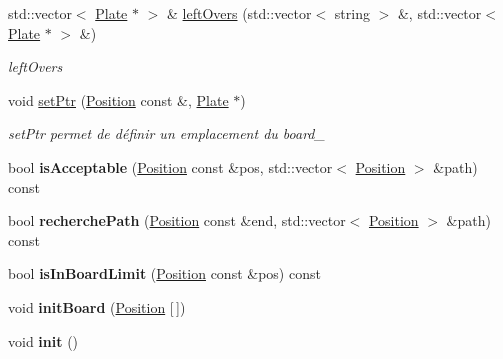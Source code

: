 \begin{DoxyCompactItemize}
\item 
std\+::vector$<$ \mbox{\hyperlink{class_plate}{Plate}} $\ast$ $>$ \& \mbox{\hyperlink{class_board_a3164f6e33a9c5a7a02d899407ef8a3d1}{left\+Overs}} (std\+::vector$<$ string $>$ \&, std\+::vector$<$ \mbox{\hyperlink{class_plate}{Plate}} $\ast$ $>$ \&)
\begin{DoxyCompactList}\small\item\em left\+Overs \end{DoxyCompactList}\item 
\mbox{\label{class_board_a7fb0f1c798ff6cb63c3105baa0725ac9}} 
void \mbox{\hyperlink{class_board_a7fb0f1c798ff6cb63c3105baa0725ac9}{set\+Ptr}} (\mbox{\hyperlink{class_position}{Position}} const \&, \mbox{\hyperlink{class_plate}{Plate}} $\ast$)
\begin{DoxyCompactList}\small\item\em set\+Ptr permet de définir un emplacement du board\+\_\+ \end{DoxyCompactList}\item 
\mbox{\label{class_board_a1217bc275b0adb87cb9c4be7bd7887cb}} 
bool {\bfseries is\+Acceptable} (\mbox{\hyperlink{class_position}{Position}} const \&pos, std\+::vector$<$ \mbox{\hyperlink{class_position}{Position}} $>$ \&path) const
\item 
\mbox{\label{class_board_ab7e0efef605fa53eae39f7c7da29536f}} 
bool {\bfseries recherche\+Path} (\mbox{\hyperlink{class_position}{Position}} const \&end, std\+::vector$<$ \mbox{\hyperlink{class_position}{Position}} $>$ \&path) const
\item 
\mbox{\label{class_board_aa671443a7c9335bffc768a7c98c5d964}} 
bool {\bfseries is\+In\+Board\+Limit} (\mbox{\hyperlink{class_position}{Position}} const \&pos) const
\item 
\mbox{\label{class_board_abd6b0539dbd0a77b0c18a41d8cf3836e}} 
void {\bfseries init\+Board} (\mbox{\hyperlink{class_position}{Position}} \mbox{[}$\,$\mbox{]})
\item 
\mbox{\label{class_board_a2cf5d799795f86a50d5d6eb4bd353b93}} 
void {\bfseries init} ()
\end{DoxyCompactItemize}

